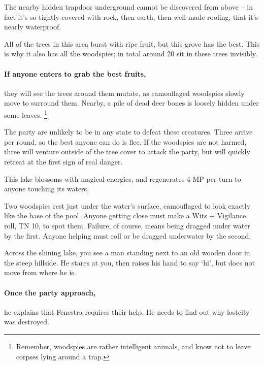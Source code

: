 \begin{multicols}{2}
The nearby hidden trapdoor underground cannot be discovered from above -- in fact it's so tightly covered with rock, then earth, then well-made roofing, that it's nearly waterproof.


All of the trees in this area burst with ripe fruit, but this grove has the best.
This is why it also has all the woodspies; in total around 20 sit in these trees invisibly.
\paragraph{If anyone enters to grab the best fruits,}
they will see the trees around them mutate, as camouflaged woodspies slowly move to surround them.
Nearby, a pile of dead deer bones is loosely hidden under some leaves.%
\footnote{Remember, woodspies are rather intelligent animals, and know not to leave corpses lying around a trap.}

The party are unlikely to be in any state to defeat these creatures.  Three arrive per round, so the best anyone can do is flee.  If the woodspies are not harmed, three will venture outside of the tree cover to attack the party, but will quickly retreat at the first sign of real danger.



This lake blossoms with magical energies, and regenerates 4 MP per turn to anyone touching its waters.

Two woodspies rest just under the water's surface, camouflaged to look exactly like the base of the pool.
Anyone getting close must make a Wits + Vigilance roll, TN 10, to spot them.
Failure, of course, means being dragged under water by the first.
Anyone helping must roll or be dragged underwater by the second.


\begin{boxtext}

	Across the shining lake, you see a man standing next to an old wooden door in the steep hillside.
	He stares at you, then raises his hand to say `hi', but does not move from where he is.

\end{boxtext}

\paragraph{Once the party approach,}
he explains that Fenestra requires their help.
He needs to find out why \gls{lostcity} was destroyed.


\end{multicols}
